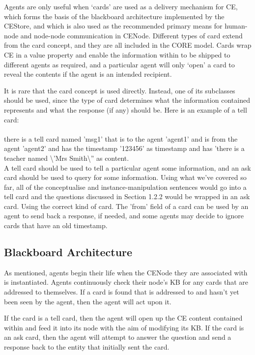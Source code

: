 \documentclass{scrartcl}
\newcommand{\ce}[1]{\textsf{#1}}
\begin{document}
Agents are only useful when `cards' are used as a delivery mechanism for CE, which forms the basis of the blackboard architecture implemented by the CEStore, and which is also used as the recommended primary means for human-node and node-node communication in CENode. Different types of card extend from the \ce{card} concept, and they are all included in the CORE model. Cards wrap CE in a value property and enable the information within to be shipped to different agents as required, and a particular agent will only `open' a card to reveal the contents if the agent is an intended recipient. 

It is rare that the \ce{card} concept is used directly. Instead, one of its subclasses should be used, since the type of card determines what the information contained represents and what the response (if any) should be. Here is an example of a \ce{tell card}:\\
\\\ce{there is a tell card named 'msg1' that is to the agent 'agent1' and is from the agent 'agent2' and has the timestamp '123456' as timestamp and has 'there is a teacher named \textbackslash'Mrs Smith\textbackslash'' as content.}\\

A \ce{tell card} should be used to tell a particular agent some information, and an \ce{ask card} should be used to query for some information. Using what we've covered so far, all of the \ce{conceptualise} and instance-manipulation sentences would go into a \ce{tell card} and the questions discussed in Section 1.2.2 would be wrapped in an \ce{ask card}. Using the correct kind of card. The 'from' field of a card can be used by an agent to send back a response, if needed, and some agents may decide to ignore cards that have an old timestamp. 


\subsection{Blackboard Architecture}
\label{blackboard_architecture}

As mentioned, agents begin their life when the CENode they are associated with is instantiated. Agents continuously check their node's KB for any cards that are addressed to themselves. If a card is found that is addressed to and hasn't yet been seen by the agent, then the agent will act upon it.

If the card is a tell card, then the agent will open up the CE content contained within and feed it into its node with the aim of modifying its KB. If the card is an ask card, then the agent will attempt to answer the question and send a response back to the entity that initially sent the card.
\end{document}
